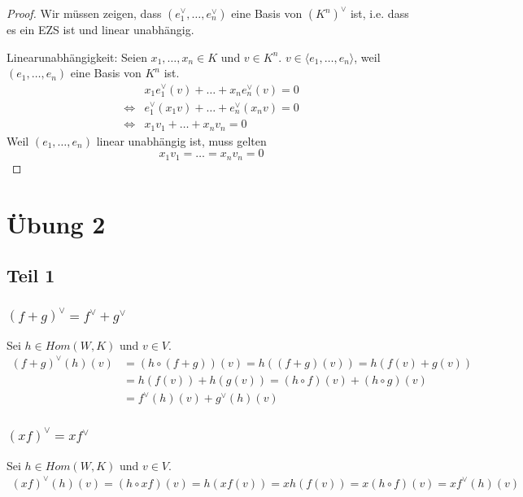 \documentclass[a4paper,10pt]{article}
\begin{document}
\begin{proof}
 Wir müssen zeigen, dass $(e_1^\vee, \dots, e_n^\vee)$ eine Basis von $(K^n)^\vee$ ist, i.e. dass es ein EZS ist und linear unabhängig.
 
 Linearunabhängigkeit: Seien $x_1, \dots, x_n \in K$ und $v \in K^n$.
 $v \in \langle e_1, \dots, e_n \rangle$, weil $(e_1, \dots, e_n)$ eine Basis von $K^n$ ist.
 \begin{align}
  & x_1e_1^\vee(v) + \dots + x_ne_n^\vee(v) = 0\\
  \Leftrightarrow & e_1^\vee(x_1v) + \dots + e_n^\vee(x_nv) = 0\\
  \Leftrightarrow & x_1v_1 + \dots + x_nv_n = 0
 \end{align}
 Weil $(e_1, \dots, e_n)$ linear unabhängig ist, muss gelten
 \begin{equation}
  x_1v_1 = \dots = x_nv_n = 0
 \end{equation}

\end{proof}

\section*{Übung 2}

\subsection*{Teil 1}

\subsubsection*{$(f + g)^\vee = f^\vee + g^\vee$}

Sei $h \in Hom(W, K)$ und $v \in V$.
\begin{align}
 (f + g)^\vee(h)(v) & = (h \circ (f + g))(v) = h((f + g)(v)) = h(f(v) + g(v))\\
 & = h(f(v)) + h(g(v)) = (h \circ f)(v) + (h \circ g)(v)\\
 & = f^\vee(h)(v) + g^\vee(h)(v)
\end{align}

\subsubsection*{$(xf)^\vee = xf^\vee$}

Sei $h \in Hom(W, K)$ und $v \in V$.
\begin{align}
 (xf)^\vee(h)(v) = (h \circ xf)(v) = h(xf(v)) = xh(f(v)) = x(h \circ f)(v) = xf^\vee(h)(v)
\end{align}
\end{document}
